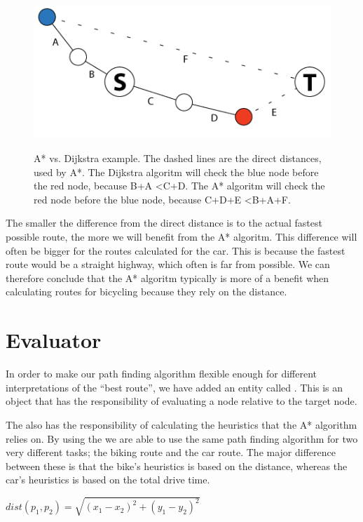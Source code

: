 \begin{figure}[!ht]
\centering
\includegraphics[width=1\linewidth]{images/AstarVSDijkstra.png}
\label{}
\caption{A* vs. Dijkstra example. The dashed lines are the direct distances,
used by A*. The Dijkstra algoritm will check the blue node before the red
node, because B+A \textless C+D. The A* algoritm will check the red node
before the blue node, because C+D+E \textless B+A+F.}
\end{figure}

The smaller the difference from the direct distance is to the actual fastest
possible route, the more we will benefit from the A* algoritm. This
difference will often be bigger for the routes calculated for the car. This is
because the fastest route would be a straight highway, which often is far from
possible. We can therefore conclude that the A* algoritm typically is more
of a benefit when calculating routes for bicycling because they rely on the
distance.

\section{Evaluator}
\label{IMPL-EVA}
In order to make our path finding algorithm flexible enough for different 
interpretations of the ``best route'', we have added an entity called . 
This is an object that has the responsibility of evaluating a node relative to 
the target node. 

The  also has the responsibility of calculating the 
heuristics that the A* algorithm relies on. By using the  we are able to 
use the same path finding algorithm for two very different tasks; the biking route and 
the car route. The major difference between these is that the bike's heuristics is based 
on the distance, whereas the car's heuristics is based on the total drive time. 

\begin{center}
$
dist(p_{1},p_{2})=\sqrt{(x_{1}-x_{2})^{2}+(y_{1}-y_{2})^{2}}
$
\end{center}

